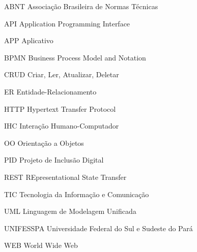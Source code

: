 %
%

\begin{siglas}
	\setlength{\baselineskip}{0.7\baselineskip}
	
	\item[ABNT] Associação Brasileira de Normas Técnicas
    \item[API]  Application Programming Interface
	\item[APP]  Aplicativo
	\item[BPMN] Business Process Model and Notation
    \item[CRUD] Criar, Ler, Atualizar, Deletar
    \item[ER]   Entidade-Relacionamento
    \item[HTTP] Hypertext Transfer Protocol
    \item[IHC]  Interação Humano-Computador
    \item[OO]   Orientação a Objetos
    \item[PID]  Projeto de Inclusão Digital
    \item[REST] REpresentational State Transfer
    \item[TIC]  Tecnologia da Informação e Comunicação
    \item[UML]  Linguagem de Modelagem Unificada
    \item[UNIFESSPA]Universidade Federal do Sul e Sudeste do Pará
    \item[WEB]  World Wide Web
    
    

\end{siglas}